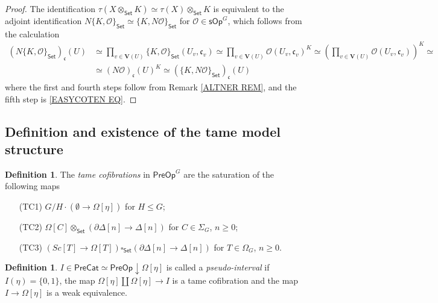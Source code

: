 \documentclass[a4paper,10pt
,draft
]{article}%
\numberwithin{equation}{section}
\numberwithin{figure}{section}
\theoremstyle{definition} %
\newtheorem{definition}[equation]{Definition}%
\renewcommand{\O}{\ensuremath{\mathcal O}}
\newcommand{\1}{\ensuremath{\mathbbm 1}}%
\begin{document}
\begin{proof}
	The identification
	$\tau(X \otimes_{\mathsf{Set}} K) \simeq \tau(X) \otimes_{\mathsf{Set}} K$
	is equivalent to the adjoint identification
	$
	N \{K,\O\}_{\mathsf{Set}}
	\simeq
	\{K,N \O\}_{\mathsf{Set}} 
	$
	for $\O \in \mathsf{sOp}^G$,
	which follows from the calculation
	\begin{equation}
	\begin{split}
	\left(N \{K,\O\}_{\mathsf{Set}}\right)_{\mathfrak{c}}(U)
	& \simeq
	\prod_{v \in \boldsymbol{V}(U)} 
	\{K,\O\}_{\mathsf{Set}}(U_v,\mathfrak{c}_v)
	\simeq
	\prod_{v \in \boldsymbol{V}(U)}
	\O(U_v,\mathfrak{c}_v)^K
	\simeq
	\left(\prod_{v \in \boldsymbol{V}(U)}
	\O(U_v,\mathfrak{c}_v)\right)^K
	\simeq 
	\\
	& \simeq
	\left(N \O\right)_{\mathfrak{c}}(U)^K
	\simeq
	\left(\{K,N \O\}_{\mathsf{Set}}\right)_{\mathfrak{c}}(U)
	\end{split}
	\end{equation}
	where the first and fourth steps follow from Remark \ref{ALTNER REM},
	and the fifth step is \eqref{EASYCOTEN EQ}.
\end{proof}




\subsection{Definition and existence of the tame model structure}


\begin{definition}\label{TAMEGENCOF DEF}
	The \emph{tame cofibrations} in $\mathsf{PreOp}^G$
	are the saturation of the following maps
	\begin{itemize}
		\item[(TC1)] $G/H \cdot \left(\emptyset \to\Omega[\eta]\right)$ for $H\leq G$;
		\item[(TC2)] $\Omega[C] \otimes_{\mathsf{Set}} \left(\partial \Delta[n] \to \Delta[n]\right)$ for $C \in \Sigma_G$, $n \geq 0$;
		\item[(TC3)] 
		$\left( Sc[T] \to \Omega[T] \right) 
		\square_{\mathsf{Set}} 
		\left(\partial \Delta[n] \to \Delta[n]\right)$ for $T \in \Omega_G$, $n \geq 0$.
	\end{itemize}
\end{definition}


\begin{definition}\label{PSEUINT DEF}
	$I \in \mathsf{PreCat}\simeq \mathsf{PreOp} \downarrow \Omega[\eta]$ 
	is called a \emph{pseudo-interval}
	if $I(\eta) = \{0,1\}$,
	the map 
	$\Omega[\eta] \amalg \Omega[\eta] \to I$
	is a tame cofibration and the map
	$I \to \Omega[\eta]$
	is a weak equivalence.
\end{definition}
\end{document}
